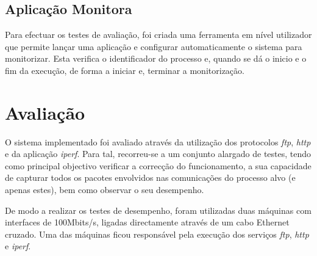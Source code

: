 \documentclass[a4paper]{llncs}
\begin{document}
\subsection{Aplicação Monitora}
\label{sub:monitor_app}

Para efectuar os testes de avaliação, foi criada uma ferramenta em nível utilizador que permite lançar uma aplicação e configurar automaticamente o sistema para monitorizar.
 Esta verifica o identificador do processo e, quando se dá o inicio e o fim da execução, de forma a iniciar e, terminar a monitorização.



\section{Avaliação}
\label{sec:evaluation}

O sistema implementado foi avaliado através da utilização dos protocolos \textit{ftp}, \textit{http} e da aplicação \textit{iperf}.
 Para tal, recorreu-se a um conjunto alargado de testes, tendo como principal objectivo verificar a correcção do funcionamento, a sua capacidade de capturar todos os pacotes envolvidos nas comunicações do processo alvo (e apenas estes), bem como observar o seu desempenho.


De modo a realizar os testes de desempenho, foram utilizadas duas máquinas com interfaces de 100Mbits/s, ligadas directamente através de um cabo Ethernet cruzado. Uma das máquinas ficou responsável pela execução dos serviços \textit{ftp}, \textit{http} e \textit{iperf}.
\end{document}
